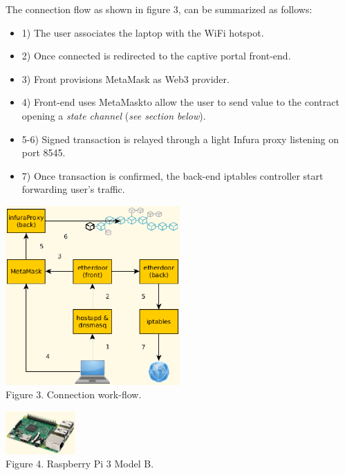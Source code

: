 \documentclass[12pt]{amsart}
\begin{document}
\begin{multicols}{2}
\vspace{0.35cm}

The connection flow as shown in figure 3, can be summarized
as follows:

\begin{itemize}
\item[] 1) The user associates the laptop with the WiFi hotspot.
\item[] 2) Once connected is redirected to the captive portal front-end.
\item[] 3) Front provisions MetaMask as Web3 provider.
\item[] 4) Front-end uses MetaMaskto allow the user
  to send value to the contract opening a \textit{state channel}
(\textit{see section below}).
\item[] 5-6) Signed transaction is relayed through a light Infura proxy listening
  on port 8545.
\item[] 7) Once transaction is confirmed, the back-end iptables controller
  start forwarding user's traffic.
\end{itemize}

\begin{center}
  \includegraphics[keepaspectratio, width=0.5\textwidth]{images/con-flow-y.eps}
\\
Figure 3. Connection work-flow.
\\
\end{center}

\begin{center}
  \includegraphics[keepaspectratio, width=0.2\textwidth]{images/rpi3modelb-sourceamazon.eps}
\\
Figure 4. Raspberry Pi 3 Model B.
\\
\end{center}


\end{multicols}
\end{document}

